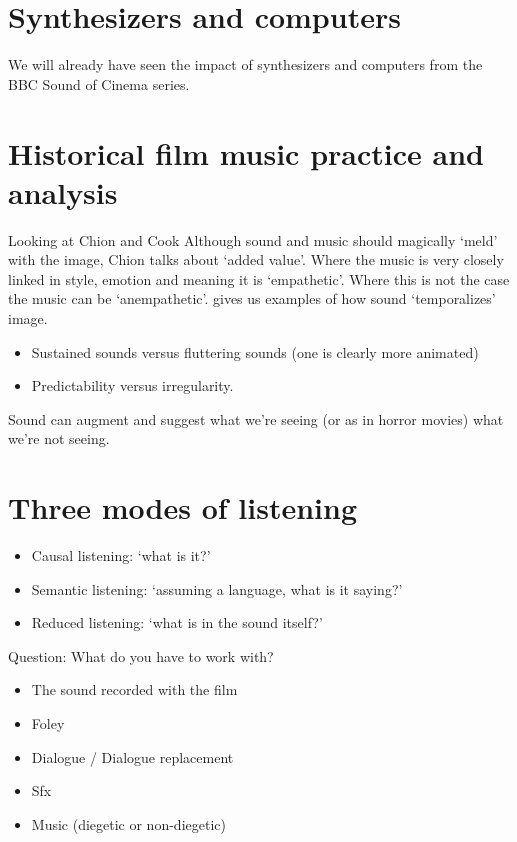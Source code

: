 \section{Synthesizers and computers}
We will already have seen the impact of synthesizers and computers from the BBC Sound of Cinema series. 

\section{Historical film music practice and analysis}
Looking at Chion \citeyearpar{chion1990} and Cook \citeyearpar{cook1998analysing}
Although sound and music should magically `meld' with the image, Chion talks about `added value'. 
Where the music is very closely linked in style, emotion and meaning it is `empathetic'. Where this is not the case the music can be `anempathetic'. 
\citep[14-15]{chion1990} gives us examples of how sound `temporalizes' image.
\begin{itemize}
\item Sustained sounds versus fluttering sounds (one is clearly more animated)
\item Predictability versus irregularity. 
\end{itemize}

Sound can augment and suggest what we're seeing (or as in horror movies) what we're not seeing. 

\section{Three modes of listening}
\begin{itemize}
\item Causal listening: `what is it?'
\item Semantic listening: `assuming a language, what is it saying?'
\item Reduced listening: `what is in the sound itself?'
\end{itemize}

Question: What do you have to work with?
\begin{itemize}
\item The sound recorded with the film
\item Foley
\item Dialogue / Dialogue replacement
\item Sfx
\item Music (diegetic or non-diegetic)
\end{itemize}

